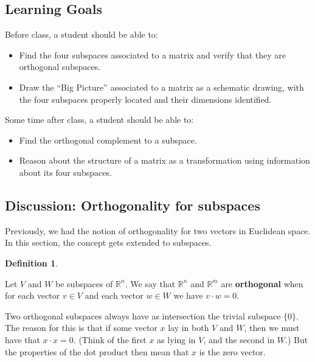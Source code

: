 \documentclass[10pt,]{book}
\newcommand{\terminology}[1]{\textbf{#1}}
\theoremstyle{plain}
\theoremstyle{definition}
\newtheorem{definition}[theorem]{Definition}
\numberwithin{equation}{section}
\begin{document}
\subsection[Learning Goals]{Learning Goals}\label{subsection-93}

      Before class, a student should be able to:
\begin{itemize}
\item{}
        Find the four subspaces associated to a matrix and verify that they
        are orthogonal subspaces.
      \item{}
        Draw the ``Big Picture'' associated to a matrix as a schematic drawing,
        with the four subspaces properly located and their dimensions identified.
      \end{itemize}
\par

      Some time after class, a student should be able to:
\begin{itemize}
\item{}Find the orthogonal complement to a subspace.\item{}
        Reason about the structure of a matrix as a transformation using information
        about its four subspaces.
      \end{itemize}
\typeout{************************************************}
\typeout{************************************************}
\subsection[Discussion: Orthogonality for subspaces]{Discussion: Orthogonality for subspaces}\label{subsection-94}

      Previously, we had the notion of orthogonality for two vectors in
      Euclidean space. In this section, the concept gets extended to subspaces.
\begin{definition}\label{definition-1}

        Let \(V\) and \(W\) be subspaces of \(\mathbb{R}^n\). We say that
        \(\mathbb{R}^n\) and \(\mathbb{R}^m\) are \terminology{orthogonal}
        when for each vector \(v \in V\) and each vector \(w \in W\) we
        have \(v \cdot w =0\).
      \end{definition}
\par

      Two orthogonal subspaces always have as intersection the trivial subspace
      \(\{ 0\}\). The reason for this is that if some vector \(x\) lay in
      both \(V\) and \(W\), then we must have that \(x \cdot x =0\).
      (Think of the first \(x\) as lying in \(V\), and the second in
      \(W\).) But the properties of the dot product then mean that \(x\)
      is the zero vector.
\par
\end{document}
